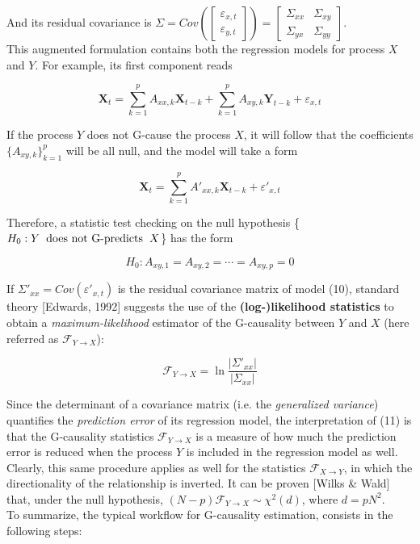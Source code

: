 \documentclass[a4paper]{article}
\begin{document}
And its residual covariance is $ \Sigma = Cov\left(\begin{bmatrix} \varepsilon_{x,t}  \\  \varepsilon_{y,t} \end{bmatrix}\right) = \begin{bmatrix} \Sigma_{xx}  &  \Sigma_{xy} \\  \Sigma_{yx}  & \Sigma_{yy} \end{bmatrix} $.\\
This augmented formulation contains both the regression models for process $X$ and $Y$. For example, its first component reads

\begin{equation}
\textbf{X}_t = \sum_{k=1}^{p} A_{xx,k} \textbf{X}_{t-k} + \sum_{k=1}^{p} A_{xy,k}  \textbf{Y}_{t-k} + \varepsilon_{x,t}
\end{equation}

If the process $Y$ does not G-cause the process $X$, it will follow that the coefficients $\{A_{xy,k}\}_{k=1}^p $ will be all null, and the model will take a form

\begin{equation}
\textbf{X}_t = \sum_{k=1}^{p} A'_{xx,k} \textbf{X}_{t-k} + \varepsilon'_{x,t}
\end{equation}

Therefore, a statistic test checking on the null hypothesis \{$ H_0:  Y \hspace{0.2cm} \text{does not G-predicts} \hspace{0.2 cm} X $\} has the form

\begin{equation}
H_0: A_{xy,1} = A_{xy,2} = \cdots = A_{xy,p} = 0
\end{equation}


If  $\Sigma'_{xx} = Cov(\varepsilon'_{x,t}) $ is the residual covariance matrix of model (10), standard theory [Edwards, 1992] suggests the use of the \textbf{(log-)likelihood statistics} to obtain a \textit{maximum-likelihood} estimator of the G-causality between $Y$ and $X$ (here referred as $ \mathcal{F}_{Y \rightarrow X} $):

\begin{equation}
\mathcal{F}_{Y \rightarrow X}  = \ln \frac{|\Sigma'_{xx}|}{|\Sigma_{xx}|}
\end{equation}


Since the determinant of a covariance matrix (i.e. the \textit{generalized variance}) quantifies the \textit{prediction error} of its regression model, the interpretation of (11) is that the G-causality statistics  $ \mathcal{F}_{Y \rightarrow X} $ is a measure of how much the prediction error is reduced when the process $Y$ is included in the regression model as well. Clearly, this same procedure applies as well for the statistics  $ \mathcal{F}_{X \rightarrow Y} $, in which the directionality of the relationship is inverted. It can be proven [Wilks \& Wald] that, under the null hypothesis, $ (N-p)\mathcal{F}_{Y \rightarrow X} \sim \chi^2(d)$, where $ d = pN^2$.
\\
To summarize, the typical workflow for G-causality estimation, consists in the following steps:
\end{document}
